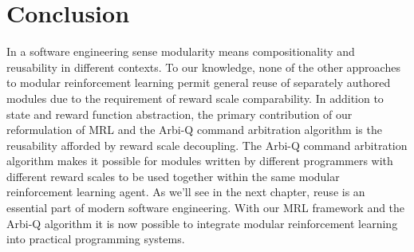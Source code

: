 \section{Conclusion}

In a software engineering sense modularity means compositionality and reusability in different contexts. To our knowledge, none of the other approaches to modular reinforcement learning permit general reuse of separately authored modules due to the requirement of reward scale comparability. In addition to state and reward function abstraction, the primary contribution of our reformulation of MRL and the Arbi-Q command arbitration algorithm is the reusability afforded by reward scale decoupling. The Arbi-Q command arbitration algorithm makes it possible for modules written by different programmers with different reward scales to be used together within the same modular reinforcement learning agent. As we'll see in the next chapter, reuse is an essential part of modern software engineering. With our MRL framework and the Arbi-Q algorithm it is now possible to integrate modular reinforcement learning into practical programming systems.
